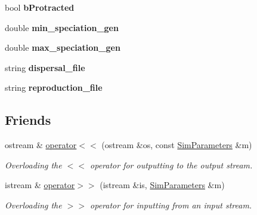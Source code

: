 \begin{DoxyCompactItemize}
\item 
bool {\bfseries b\+Protracted}\hypertarget{struct_sim_parameters_a4efee9b23f722abcaac1252e0722dd31}{}\label{struct_sim_parameters_a4efee9b23f722abcaac1252e0722dd31}

\item 
double {\bfseries min\+\_\+speciation\+\_\+gen}\hypertarget{struct_sim_parameters_a9356adf501b3ed9af2c30fcb525762fc}{}\label{struct_sim_parameters_a9356adf501b3ed9af2c30fcb525762fc}

\item 
double {\bfseries max\+\_\+speciation\+\_\+gen}\hypertarget{struct_sim_parameters_aa482e642b80dc339e44f79f9c0be8324}{}\label{struct_sim_parameters_aa482e642b80dc339e44f79f9c0be8324}

\item 
string {\bfseries dispersal\+\_\+file}\hypertarget{struct_sim_parameters_aa7966dd17cfc1f04211e75f92de3bf25}{}\label{struct_sim_parameters_aa7966dd17cfc1f04211e75f92de3bf25}

\item 
string {\bfseries reproduction\+\_\+file}\hypertarget{struct_sim_parameters_ade1188f6c86ee8b46091be3fb314d73d}{}\label{struct_sim_parameters_ade1188f6c86ee8b46091be3fb314d73d}

\end{DoxyCompactItemize}
\subsection*{Friends}
\begin{DoxyCompactItemize}
\item 
ostream \& \hyperlink{struct_sim_parameters_a9a762d7dd8157c538a45194e17fed2e8}{operator$<$$<$} (ostream \&os, const \hyperlink{struct_sim_parameters}{Sim\+Parameters} \&m)
\begin{DoxyCompactList}\small\item\em Overloading the $<$$<$ operator for outputting to the output stream. \end{DoxyCompactList}\item 
istream \& \hyperlink{struct_sim_parameters_a5265cab3c1560ae4133b04a3a434a892}{operator$>$$>$} (istream \&is, \hyperlink{struct_sim_parameters}{Sim\+Parameters} \&m)
\begin{DoxyCompactList}\small\item\em Overloading the $>$$>$ operator for inputting from an input stream. \end{DoxyCompactList}\end{DoxyCompactItemize}


